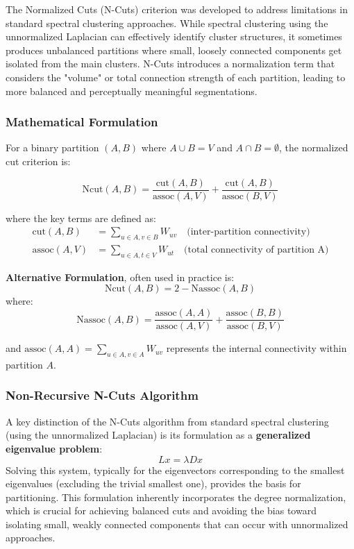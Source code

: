 \documentclass[12pt,a4paper]{article}
\begin{document}
The Normalized Cuts (N-Cuts) criterion was developed to address limitations in standard spectral clustering approaches. While spectral clustering using the unnormalized Laplacian can effectively identify cluster structures, it sometimes produces unbalanced partitions where small, loosely connected components get isolated from the main clusters. N-Cuts introduces a normalization term that considers the "volume" or total connection strength of each partition, leading to more balanced and perceptually meaningful segmentations.


\subsubsection{Mathematical Formulation}

For a binary partition $(A, B)$ where $A \cup B = V$ and $A \cap B = \emptyset$, the normalized cut criterion is:

\begin{equation}
\text{Ncut}(A,B) = \frac{\text{cut}(A,B)}{\text{assoc}(A,V)} + \frac{\text{cut}(A,B)}{\text{assoc}(B,V)}
\end{equation}

where the key terms are defined as:
\begin{align}
\text{cut}(A,B) &= \sum_{u \in A, v \in B} W_{uv} \quad \text{(inter-partition connectivity)} \\
\text{assoc}(A,V) &= \sum_{u \in A, t \in V} W_{ut} \quad \text{(total connectivity of partition A)}
\end{align}

\textbf{Alternative Formulation}, often used in practice is:
\begin{equation}
\text{Ncut}(A,B) = 2 - \text{Nassoc}(A,B)
\end{equation}
where:
\begin{equation}
\text{Nassoc}(A,B) = \frac{\text{assoc}(A,A)}{\text{assoc}(A,V)} + \frac{\text{assoc}(B,B)}{\text{assoc}(B,V)}
\end{equation}

and $\text{assoc}(A,A) = \sum_{u \in A, v \in A} W_{uv}$ represents the internal connectivity within partition $A$.


\subsubsection{Non-Recursive N-Cuts Algorithm}

A key distinction of the N-Cuts algorithm from standard spectral clustering (using the unnormalized Laplacian) is its formulation as a \textbf{generalized eigenvalue problem}:
\begin{equation}
Lx = \lambda Dx
\end{equation}
Solving this system, typically for the eigenvectors corresponding to the smallest eigenvalues (excluding the trivial smallest one), provides the basis for partitioning. This formulation inherently incorporates the degree normalization, which is crucial for achieving balanced cuts and avoiding the bias toward isolating small, weakly connected components that can occur with unnormalized approaches.
\end{document}
